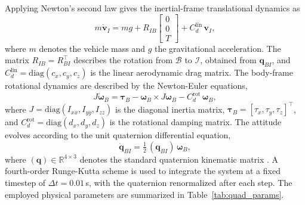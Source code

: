 \documentclass[12pt, a4paper]{article}
\begin{document}
Applying Newton's second law gives the inertial-frame translational dynamics as
\begin{equation}
    m\dot{\mathbf{v}}_I =
        mg +
        R_{IB}\begin{bmatrix}0 \\ 0 \\ T\end{bmatrix} +
        C_d^{\text{lin}}\,\mathbf{v}_I,
    \label{eq:trans}
\end{equation}
where $m$ denotes the vehicle mass and $g$ the gravitational acceleration.
The matrix $R_{IB} = R_{BI}^{\top}$ describes the rotation from $\mathcal{B}$ to $\mathcal{I}$, obtained from $\mathbf{q}_{BI}$, and $C_d^{\text{lin}} = \mathrm{diag}(c_x, c_y, c_z)$ is the linear aerodynamic drag matrix.
The body-frame rotational dynamics are described by the Newton-Euler equations,
\begin{equation}
    J\dot{\boldsymbol{\omega}}_B =
        \boldsymbol{\tau}_B -
        \boldsymbol{\omega}_B \times J\boldsymbol{\omega}_B -
        C_d^{\text{rot}}\,\boldsymbol{\omega}_B,
    \label{eq:rot}
\end{equation}
where $J = \mathrm{diag}(I_{xx}, I_{yy}, I_{zz})$ is the diagonal inertia matrix, $\boldsymbol{\tau}_B = [\tau_x, \tau_y, \tau_z]^{\top}$, and $C_d^{\text{rot}} = \mathrm{diag}(d_x, d_y, d_z)$ is the rotational damping matrix.
The attitude evolves according to the unit quaternion differential equation,
\begin{equation}
    \dot{\mathbf{q}}_{BI} =
        \tfrac{1}{2}\,(\mathbf{q}_{BI})\,\boldsymbol{\omega}_B,
\end{equation}
where $(\mathbf{q}) \in \mathbb{R}^{4\times3}$ denotes the standard quaternion kinematic matrix \parencite{shastry_development_2018}.
A fourth-order Runge-Kutta scheme is used to integrate the system at a fixed timestep of $\Delta t = 0.01$\,s, with the quaternion renormalized after each step.
The employed physical parameters are summarized in Table~\ref{tab:quad_params}.
\end{document}
